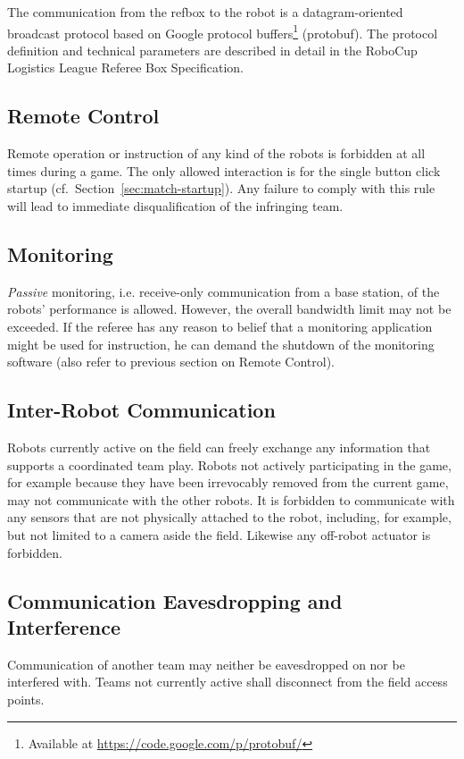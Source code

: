 \documentclass[12pt,twoside]{article}
\newcommand{\refsec}[1]{Section~\ref{#1}}
\begin{document}
The communication from the refbox to the robot is a datagram-oriented
broadcast protocol based on Google protocol buffers\footnote{Available
  at \url{https://code.google.com/p/protobuf/}} (protobuf). The
protocol definition and technical parameters are described in detail
in the RoboCup Logistics League Referee Box Specification.

\subsection{Remote Control}
\label{sec:remote-control}
Remote operation or instruction of any kind of the robots is forbidden
at all times during a game. The only allowed interaction is for the
single button click startup (cf.~\refsec{sec:match-startup}). Any
failure to comply with this rule will lead to immediate
disqualification of the infringing team.

\subsection{Monitoring}
\label{sec:monitoring}
\emph{Passive} monitoring, i.e. receive-only communication from a base
station, of the robots' performance is allowed. However, the overall
bandwidth limit may not be exceeded.
If the referee has any reason to belief that a monitoring application
might be used for instruction, he can demand the shutdown of the
monitoring software (also refer to previous section on Remote
Control).

\subsection{Inter-Robot Communication}
\label{sec:inter-robot-comm}
Robots currently active on the field can freely exchange any
information that supports a coordinated team play. Robots not actively
participating in the game, for example because they have been
irrevocably removed from the current game, may not communicate with
the other robots. It is forbidden to communicate with any sensors that
are not physically attached to the robot, including, for example, but
not limited to a camera aside the field. Likewise any off-robot
actuator is forbidden.

\subsection{Communication Eavesdropping and Interference}
\label{sec:comm-tampering}
Communication of another team may neither be eavesdropped on nor be
interfered with. Teams not currently active shall disconnect from the
field access points.
\end{document}
